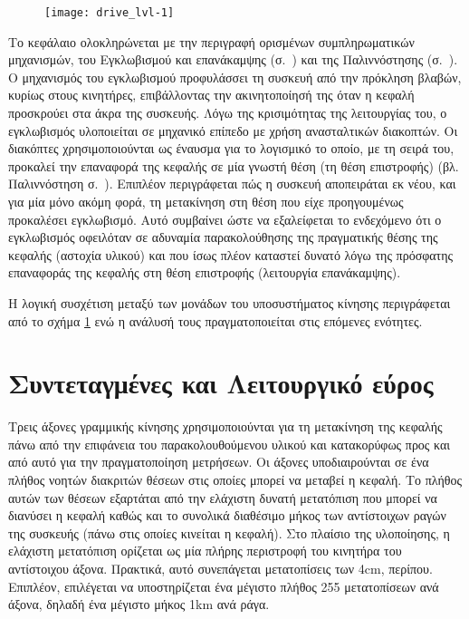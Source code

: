 \begin{figure}
    \caption{\label{fig:motor:lvl-1}}
    \begin{center}
    \texttt{[image: drive\_lvl-1]}
    \end{center}
\end{figure}

Το κεφάλαιο ολοκληρώνεται με την περιγραφή ορισμένων συμπληρωματικών
μηχανισμών, του Εγκλωβισμού και επανάκαμψης (σ.~\pageref{sec:motor:backtrack})
και της Παλιννόστησης (σ.~\pageref{subsec:motor:homing}). Ο μηχανισμός του
εγκλωβισμού προφυλάσσει τη συσκευή
από την πρόκληση βλαβών, κυρίως στους κινητήρες, επιβάλλοντας την ακινητοποίησή
της όταν
η κεφαλή προσκρούει στα άκρα της συσκευής. Λόγω της κρισιμότητας της λειτουργίας
του, ο εγκλωβισμός υλοποιείται σε μηχανικό επίπεδο με χρήση ανασταλτικών
διακοπτών. Οι διακόπτες χρησιμοποιούνται ως έναυσμα για το λογισμικό το οποίο,
με τη σειρά του, προκαλεί την επαναφορά της κεφαλής σε μία γνωστή θέση (τη θέση
επιστροφής) (βλ. Παλιννόστηση σ.~\pageref{subsec:motor:homing}).
Επιπλέον περιγράφεται πώς η συσκευή αποπειράται εκ νέου, και για μία μόνο ακόμη
φορά, τη μετακίνηση στη θέση που είχε προηγουμένως προκαλέσει εγκλωβισμό. Αυτό
συμβαίνει ώστε να εξαλείφεται το ενδεχόμενο ότι ο εγκλωβισμός οφειλόταν σε
αδυναμία παρακολούθησης της πραγματικής θέσης της κεφαλής (αστοχία υλικού) και
που ίσως πλέον καταστεί δυνατό λόγω της πρόσφατης επαναφοράς της κεφαλής στη
θέση επιστροφής (λειτουργία επανάκαμψης).

Η λογική συσχέτιση μεταξύ των μονάδων του υποσυστήματος κίνησης περιγράφεται από
το σχήμα \ref{fig:motor:lvl-1} ενώ η ανάλυσή τους πραγματοποιείται στις επόμενες
ενότητες.

%
%

\section{Συντεταγμένες και Λειτουργικό εύρος}
\label{sec:motor:coordinates}

Τρεις άξονες γραμμικής κίνησης χρησιμοποιούνται για τη μετακίνηση της κεφαλής
πάνω από την επιφάνεια του παρακολουθούμενου υλικού και κατακορύφως προς και από
αυτό για την πραγματοποίηση μετρήσεων.
Οι άξονες υποδιαιρούνται σε ένα πλήθος νοητών διακριτών θέσεων στις οποίες
μπορεί να μεταβεί η κεφαλή. Το πλήθος αυτών των θέσεων εξαρτάται από την
ελάχιστη δυνατή μετατόπιση που μπορεί να διανύσει η κεφαλή καθώς και το συνολικά
διαθέσιμο μήκος των αντίστοιχων ραγών της συσκευής (πάνω στις οποίες κινείται η
κεφαλή). Στο πλαίσιο της υλοποίησης, η ελάχιστη μετατόπιση ορίζεται ως μία
πλήρης περιστροφή του κινητήρα του αντίστοιχου άξονα. Πρακτικά, αυτό συνεπάγεται
μετατοπίσεις των 4cm, περίπου. Επιπλέον, επιλέγεται να υποστηρίζεται ένα μέγιστο
πλήθος 255 μετατοπίσεων ανά άξονα, δηλαδή ένα μέγιστο μήκος 1km ανά ράγα.

